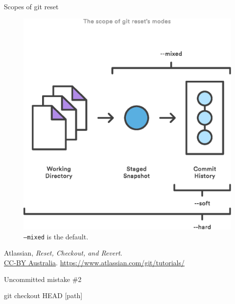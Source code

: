 \begin{frame}{Scopes of git reset}
  \begin{figure}
    \includegraphics[scale=0.4]{reset_scopes.eps}
    \\ \texttt{--mixed} is the default.
  \end{figure}
  \footnotesize{Atlassian,
    \emph{Reset, Checkout, and Revert}.\\
    \href{http://creativecommons.org/licenses/by/2.5/au/legalcode}{CC-BY Australia}.
    \href{https://www.atlassian.com/git/tutorials/}
    {https://www.atlassian.com/git/tutorials/}}

\end{frame}

\begin{frame}[fragile]{Uncommitted mistake \#2}

  \color{ucMaroon}{I modified one file incorrectly but didn't commit. Can I
  restore just that one file?}

  \qquad

  \begin{gitCommand}git checkout HEAD [path]\end{gitCommand}
\end{frame}

